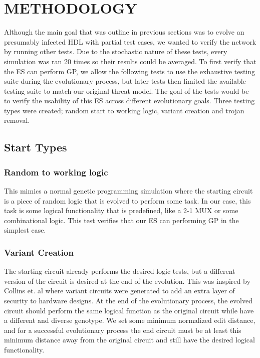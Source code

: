 \documentclass[conference]{IEEEtran}
\begin{document}
{%

\section{METHODOLOGY}
\par Although the main goal that was outline in previous sections was to evolve an presumably infected HDL with partial test cases, we wanted to verify the network by running other tests.
Due to the stochastic nature of these tests, every simulation was ran 20 times so their results could be averaged.
To first verify that the ES can perform GP, we allow the following tests to use the exhaustive testing suite during the evolutionary process, but later tests then limited the available testing suite to match our original threat model.
The goal of the tests would be to verify the usability of this ES across different evolutionary goals.
Three testing types were created; random start to working logic, variant creation and trojan removal.

\subsection{Start Types}

\subsubsection{Random to working logic}
\par This mimics a normal genetic programming simulation where the starting circuit is a piece of random logic that is evolved to perform some task.
In our case, this task is some logical functionality that is predefined, like a 2-1 MUX or some combinational logic.
This test verifies that our ES can performing GP in the simplest case. 

\subsubsection{Variant Creation}
\par The starting circuit already performs the desired logic tests, but a different version of the circuit is desired at the end of the evolution.
This was inspired by Collins et. al\cite{collins2019evolvable} where variant circuits were generated to add an extra layer of security to hardware designs.
At the end of the evolutionary process, the evolved circuit should perform the same logical function as the original circuit while have a different and diverse genotype. 
We set some minimum normalized edit distance, and for a successful evolutionary process the end circuit must be at least this minimum distance away from the original circuit and still have the desired logical functionality.

}
\end{document}
